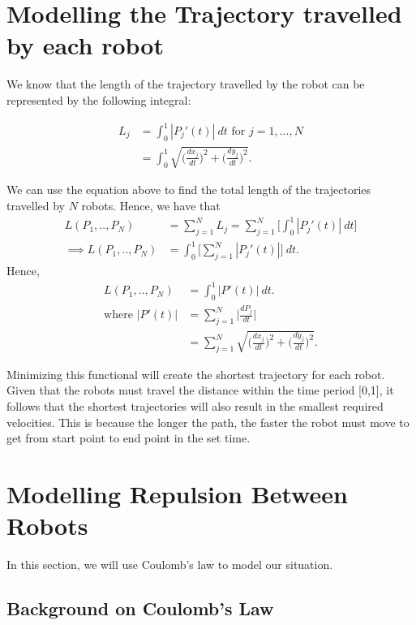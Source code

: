 \section{Modelling the Trajectory travelled by each robot}

We know that the length of the trajectory travelled by the robot can be represented by the following integral:

\begin{align*}
    L_j &= \int_{0}^{1}|P_j'(t)| \ dt \text{ for } j = 1,...,N \\
        &= \int_{0}^{1} \sqrt{\bigg(\frac{dx_j}{dt}\bigg)^2 + \bigg(\frac{dy_j}{dt}\bigg)^2}.
\end{align*}

We can use the equation above to find the total length of the trajectories travelled by \( N \) robots. Hence, we have that    %
\begin{align*}
    L(P_1,..,P_N) &= \sum_{j=1}^{N}L_j 
                  = \sum_{j=1}^{N} \bigg[\int_{0}^{1} |P_j'(t)| \ dt \bigg] \\ 
   \implies L(P_1,..,P_N) &= \int_{0}^{1} \bigg[ \sum_{j=1}^{N} |P_j'(t)|\bigg] \ dt. 
\end{align*}
Hence,
\begin{align*}
    L(P_1,..,P_N) &= \int_{0}^{1}|P'(t)| \ dt. \\
    \text{where } |P'(t)| &= \sum_{j=1}^{N}\bigg| \frac{dP_j}{dt}\bigg| \\
                          &= \sum_{j=1}^{N} \sqrt{\bigg(\frac{dx_j}{dt}\bigg)^2 + \bigg(\frac{dy_j}{dt}\bigg)^2}.
\end{align*}

Minimizing this functional will create the shortest trajectory for each robot. Given that the robots must travel the distance within the time period [0,1], it follows that the shortest trajectories will also result in the smallest required velocities. This is because the longer the path, the faster the robot must move to get from start point to end point in the set time. 


\section{Modelling Repulsion Between Robots}

In this section, we will use Coulomb's law to model our situation.

\subsection{Background on Coulomb's Law}

